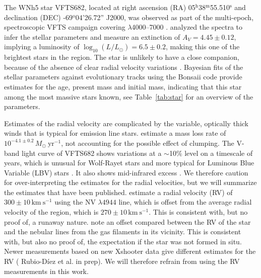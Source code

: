 \documentclass[apjl,twocolumn]{emulateapj}
\newcommand{\kms}{{\,\mathrm{km\ s^{-1}}}}
\DeclareRobustCommand{\Tabref}[1]{Table~\ref{#1}}
\begin{document}
The WNh5 star VFTS682, located at right ascension (RA)
05$^\mathrm{h}$38$^\mathrm{m}$55.510$^\mathrm{s}$  and declination
(DEC) \mbox{-69$^\mathrm{o}$04'26.72''} J2000, was observed as part of the multi-epoch, spectroscopic VFTS campaign covering $\lambda$4000--7000 \citep[][]{evans:11}. 
%
%
\citet{bestenlehner:11}  analyzed the spectra to infer the stellar parameters and measure an extinction of $A_V=4.45\pm0.12$, implying a luminosity of $\log_{10}(L/L_\odot) =  6.5\pm0.2$, making this one of the brightest stars in the region. The star is unlikely to have a close companion, because of the absence of clear radial velocity variations \citet{bestenlehner:11}.  Bayesian fits of the stellar parameters against evolutionary tracks \citep{brott:11, kohler:15} using the Bonsaii code \citep{schneider:17, schneider:18} provide estimates for the age, present mass and initial mass, indicating that this star among the most massive stars known, see \Tabref{tab:star} for an overview of the parameters.

Estimates of the radial velocity are complicated by the variable, optically thick winds that is typical for emission line stars. \citet{bestenlehner:11} estimate a mass loss rate of $10^{-4.1\pm0.2}\,M_\odot \ \mathrm{yr}^{-1}$, not accounting for the possible effect of clumping.  The V-band light curve of VFTS682  shows variations at a $\sim$10\% level on a timescale of years, which is unusual for Wolf-Rayet stars and more typical for Luminous Blue Variable (LBV) stars \citep{udalski:08, bestenlehner:11}. It also shows mid-infrared excess \citep{gruendl:09}.  We therefore caution for over-interpreting the estimates for the radial velocities, but we will summarize the estimates that have been published.  \citet{bestenlehner:11}  estimate a radial velocity (RV) of  $300\pm10\kms$ using the  N{\footnotesize V} $\lambda4944$ line, which is offset from the average radial velocity of the region, which is  $270\pm10\kms$. This is consistent with, but no proof of, a runaway nature.  \cite{bressert:12} note an offset compared between the RV of the star and the nebular lines from the gas filaments in its vicinity. This is consistent with, but also no proof of, the expectation if the star was not formed in situ.  Newer measurements based on new Xshooter data give different estimates for the RV ({\color{blue} Rubio-D{\' i}ez et al. in prep}). We will therefore refrain from using the RV measurements in this work. 
\end{document}
